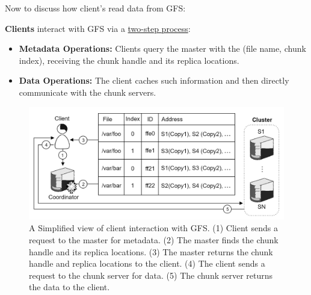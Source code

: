 \newpage

\noindent
Now to discuss how client's read data from GFS:
\begin{Def}

  \textbf{Clients} interact with GFS via a \underline{two-step process}:
  \begin{itemize}
    \item \textbf{Metadata Operations:} Clients query the master with the (file name, chunk index), receiving the chunk handle and its replica locations.
    \item \textbf{Data Operations:} The client caches such information and then directly communicate with the chunk servers.
  \end{itemize}
\end{Def}

\begin{figure}[h]
  \centering
  \includegraphics[width=\textwidth]{Sections/gfs/interaction.png}
  \caption{A Simplified view of client interaction with GFS. (1) Client sends a request to the master for metadata. (2) The master finds the chunk handle and its replica locations. 
  (3) The master returns the chunk handle and replica locations to the client. (4) The client sends a request to the chunk server for data. (5) The chunk server returns the data to the client.}
  \label{fig:gfs-client}
\end{figure}
    
